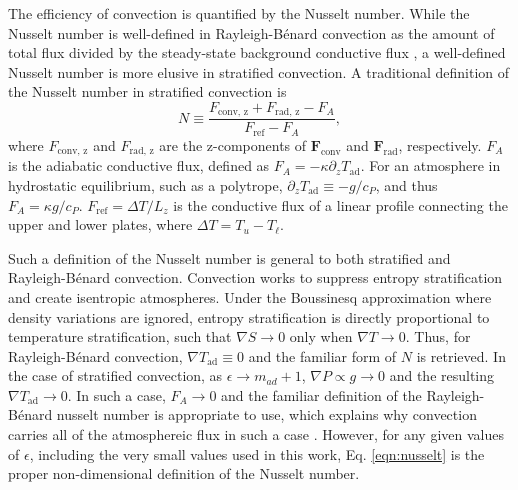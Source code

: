 \documentclass[aps, prl, twocolumn, groupedaddress, amsfonts, amssymb, amsmath]{revtex4-1}
\newcommand{\grad}{\ensuremath{\nabla}}
\newcommand{\RB}{Rayleigh-B\'{e}nard }
\begin{document}
The efficiency of convection is quantified by the Nusselt number.  
While the Nusselt number is well-defined in \RB convection
as the amount of total flux divided by the steady-state background conductive flux 
\cite{johnston&doering2009, otero&all2002},
a well-defined Nusselt number is more elusive in stratified convection.  A traditional definition of the Nusselt
number in stratified convection is \cite{graham1975,hurlburt&all1984}
\begin{equation}
N \equiv \frac{F_{\text{conv, z}} + F_{\text{rad, z}} - F_A}{F_{\text{ref}} - F_A},
\label{eqn:nusselt}
\end{equation}
where $F_{\text{conv, z}}$ and $F_{\text{rad, z}}$ are the z-components of $\bm{F}_{\text{conv}}$ and $\bm{F}_{\text{rad}}$,
respectively.  $F_A$ is the adiabatic conductive flux, defined as $F_A = -\kappa \partial_z T_{\text{ad}}$.  For an
atmosphere in hydrostatic equilibrium, such as a polytrope, $\partial_z T_{\text{ad}} \equiv - g / c_{P}$, and thus
$F_A = \kappa g / c_{P}$.  $F_{\text{ref}} = \Delta T / L_z$ is the conductive flux of a linear profile connecting the upper
and lower plates, where $\Delta T = T_{u} - T_{\ell}$.

Such a definition of the Nusselt number is general to both stratified and \RB convection.  Convection works to
suppress entropy stratification and create isentropic atmospheres.  Under the Boussinesq approximation where
density variations are ignored, entropy stratification is directly proportional to temperature stratification,
such that $\grad S \rightarrow 0$ only when $\grad T \rightarrow 0$.  Thus, for \RB convection, 
$\grad T_{\text{ad}} \equiv 0$ and the familiar form of $N$ is retrieved.  In the case of stratified convection,
as $\epsilon \rightarrow m_{ad} + 1$, $\grad P \propto g \rightarrow 0$ and
the resulting $\grad T_{\text{ad}} \rightarrow 0$.  In such a case, $F_A \rightarrow 0$ and the familiar
definition of the \RB nusselt number is appropriate to use, which explains why convection carries all of the
atmosphereic flux in such a case \cite{brandenburg&all2005}. However, for any given values of $\epsilon$, including
the very small values used in this work, Eq. \ref{eqn:nusselt} is the proper non-dimensional definition
of the Nusselt number.
\end{document}
